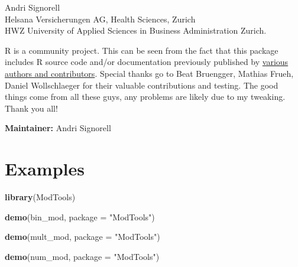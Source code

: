 \documentclass[
]{article}
\newenvironment{Shaded}{\begin{snugshade}}{\end{snugshade}}
\newcommand{\AttributeTok}[1]{\textcolor[rgb]{0.13,0.29,0.53}{#1}}
\newcommand{\FunctionTok}[1]{\textcolor[rgb]{0.13,0.29,0.53}{\textbf{#1}}}
\newcommand{\NormalTok}[1]{#1}
\newcommand{\StringTok}[1]{\textcolor[rgb]{0.31,0.60,0.02}{#1}}
\begin{document}
Andri Signorell\\
Helsana Versicherungen AG, Health Sciences, Zurich\\
HWZ University of Applied Sciences in Business Administration Zurich.

R is a community project. This can be seen from the fact that this
package includes R source code and/or documentation previously published
by \href{https://andrisignorell.github.io/ModTools/authors.html}{various
authors and contributors}. Special thanks go to Beat Bruengger, Mathias
Frueh, Daniel Wollschlaeger for their valuable contributions and
testing. The good things come from all these guys, any problems are
likely due to my tweaking. Thank you all!

\textbf{Maintainer:} Andri Signorell

\section{Examples}\label{examples}

\begin{Shaded}
\begin{Highlighting}[]
\FunctionTok{library}\NormalTok{(ModTools)}
\end{Highlighting}
\end{Shaded}

\begin{Shaded}
\begin{Highlighting}[]
\FunctionTok{demo}\NormalTok{(bin\_mod, }\AttributeTok{package =} \StringTok{"ModTools"}\NormalTok{)}
\end{Highlighting}
\end{Shaded}

\begin{Shaded}
\begin{Highlighting}[]
\FunctionTok{demo}\NormalTok{(mult\_mod, }\AttributeTok{package =} \StringTok{"ModTools"}\NormalTok{)}
\end{Highlighting}
\end{Shaded}

\begin{Shaded}
\begin{Highlighting}[]
\FunctionTok{demo}\NormalTok{(num\_mod, }\AttributeTok{package =} \StringTok{"ModTools"}\NormalTok{)}
\end{Highlighting}
\end{Shaded}
\end{document}

